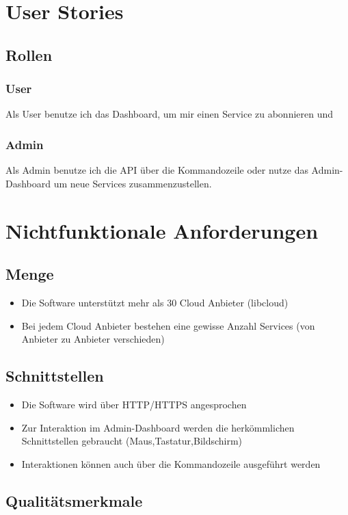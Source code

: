 \documentclass[11pt]{scrartcl}
\begin{document}
\section{User Stories}
\subsection{Rollen}
\subsubsection{User}
Als User benutze ich das Dashboard, um mir einen Service zu abonnieren und 
\subsubsection{Admin}
Als Admin benutze ich die API über die Kommandozeile oder nutze das 
Admin-Dashboard um neue Services zusammenzustellen.



\section{Nichtfunktionale Anforderungen}
\subsection{Menge}
\begin{itemize}
  \item Die Software unterstützt mehr als 30 Cloud Anbieter (libcloud)
  \item Bei jedem Cloud Anbieter bestehen eine gewisse Anzahl Services (von Anbieter zu Anbieter verschieden)
\end{itemize}

\subsection{Schnittstellen}
\begin{itemize}
  \item Die Software wird über HTTP/HTTPS angesprochen
  \item Zur Interaktion im Admin-Dashboard werden die herkömmlichen 
  Schnittstellen gebraucht (Maus,Tastatur,Bildschirm)
  \item Interaktionen können auch über die Kommandozeile ausgeführt werden
\end{itemize}
\subsection{Qualitätsmerkmale}
\end{document}
